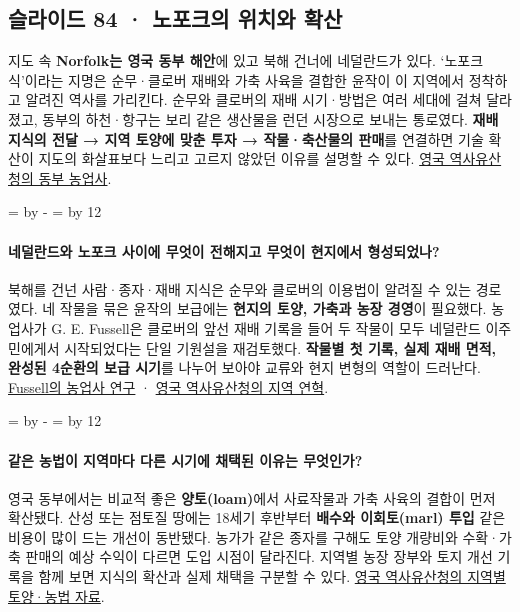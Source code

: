 \documentclass[10pt,a4paper]{article}
\newcommand{\ReserveQuestionSpace}{%
  \par\begingroup
  \dimen0=\pagegoal \advance\dimen0 by -\pagetotal
  \dimen2=\baselineskip \multiply\dimen2 by 12
  \ifdim\dimen0<\dimen2 \newpage\fi
  \endgroup}
\begin{document}
\subsection{슬라이드 84 · 노포크의 위치와 확산}
지도 속 \textbf{Norfolk는 영국 동부 해안}에 있고 북해 건너에 네덜란드가 있다. ‘노포크식’이라는 지명은 순무·클로버 재배와 가축 사육을 결합한 윤작이 이 지역에서 정착하고 알려진 역사를 가리킨다. 순무와 클로버의 재배 시기·방법은 여러 세대에 걸쳐 달라졌고, 동부의 하천·항구는 보리 같은 생산물을 런던 시장으로 보내는 통로였다. \textbf{재배 지식의 전달 → 지역 토양에 맞춘 투자 → 작물·축산물의 판매}를 연결하면 기술 확산이 지도의 화살표보다 느리고 고르지 않았던 이유를 설명할 수 있다. \href{https://historicengland.org.uk/images-books/publications/historic-farmsteads-preliminary-character-statement-east-of-england/historic-farmsteads-east-england-part2/}{영국 역사유산청의 동부 농업사}.\par

\ReserveQuestionSpace
\paragraph{네덜란드와 노포크 사이에 무엇이 전해지고 무엇이 현지에서 형성되었나?}
북해를 건넌 사람·종자·재배 지식은 순무와 클로버의 이용법이 알려질 수 있는 경로였다. 네 작물을 묶은 윤작의 보급에는 \textbf{현지의 토양, 가축과 농장 경영}이 필요했다. 농업사가 G. E. Fussell은 클로버의 앞선 재배 기록을 들어 두 작물이 모두 네덜란드 이주민에게서 시작되었다는 단일 기원설을 재검토했다. \textbf{작물별 첫 기록, 실제 재배 면적, 완성된 4순환의 보급 시기}를 나누어 보아야 교류와 현지 변형의 역할이 드러난다. \href{https://www.balh.org.uk/publication-tlh-the-amateur-historian-volume-4-number-1-autumn-1958}{Fussell의 농업사 연구} · \href{https://historicengland.org.uk/images-books/publications/historic-farmsteads-preliminary-character-statement-east-of-england/historic-farmsteads-east-england-part2/}{영국 역사유산청의 지역 연혁}.\par

\ReserveQuestionSpace
\paragraph{같은 농법이 지역마다 다른 시기에 채택된 이유는 무엇인가?}
영국 동부에서는 비교적 좋은 \textbf{양토(loam)}에서 사료작물과 가축 사육의 결합이 먼저 확산됐다. 산성 또는 점토질 땅에는 18세기 후반부터 \textbf{배수와 이회토(marl) 투입} 같은 비용이 많이 드는 개선이 동반됐다. 농가가 같은 종자를 구해도 토양 개량비와 수확·가축 판매의 예상 수익이 다르면 도입 시점이 달라진다. 지역별 농장 장부와 토지 개선 기록을 함께 보면 지식의 확산과 실제 채택을 구분할 수 있다. \href{https://historicengland.org.uk/images-books/publications/historic-farmsteads-preliminary-character-statement-east-of-england/historic-farmsteads-east-england-part2/}{영국 역사유산청의 지역별 토양·농법 자료}.\par
\end{document}
